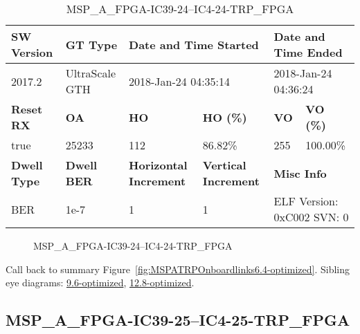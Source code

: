 \begin{table}[h]
\centering
\caption{MSP\_A\_FPGA-IC39-24--IC4-24-TRP\_FPGA}
\label{tab:MSPAFPGAIC3924IC424TRPFPGA6.4-optimized}
\begin{tabular}{@{}|l|l|l|l|l|l|@{}}
\toprule
\textbf{SW Version}                & \textbf{GT Type}   & \multicolumn{2}{l|}{\textbf{Date and Time Started}}            & \multicolumn{2}{l|}{\textbf{Date and Time Ended}}        \\ \midrule
2017.2                       & UltraScale GTH          & \multicolumn{2}{l|}{2018-Jan-24 04:35:14}                   & \multicolumn{2}{l|}{2018-Jan-24 04:36:24}               \\ \midrule
\textbf{Reset RX}                  & \textbf{OA} & \textbf{HO}   & \textbf{HO (\%)} & \textbf{VO} & \textbf{VO (\%)} \\ \midrule
true & 25233        & 112          & 86.82\%        & 255        & 100.00\%       \\ \midrule
\textbf{Dwell Type}                & \textbf{Dwell BER} & \textbf{Horizontal Increment} & \textbf{Vertical Increment}    & \multicolumn{2}{l|}{\textbf{Misc Info}}                  \\ \midrule
BER                            & 1e-7        & 1        & 1           & \multicolumn{2}{l|}{ELF Version: 0xC002 SVN: 0}                         \\ \bottomrule
\end{tabular}
\end{table}

\begin{figure}[h]
\caption{MSP\_A\_FPGA-IC39-24--IC4-24-TRP\_FPGA} \label{fig:MSPAFPGAIC3924IC424TRPFPGA6.4-optimized}
\end{figure}

Call back to summary Figure~\ref{fig:MSPATRPOnboardlinks6.4-optimized}.
Sibling eye diagrams: \hyperref[sec:MSPAFPGAIC3924IC424TRPFPGA9.6-optimized]{9.6-optimized}, \hyperref[sec:MSPAFPGAIC3924IC424TRPFPGA12.8-optimized]{12.8-optimized}.

\clearpage
\newpage


\subsection{MSP\_A\_FPGA-IC39-25--IC4-25-TRP\_FPGA}\label{sec:MSPAFPGAIC3925IC425TRPFPGA6.4-optimized}

